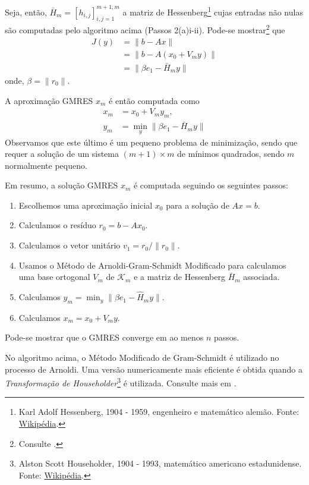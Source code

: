 Seja, então, $\bar{H}_m = [h_{i,j}]_{i,j=1}^{m+1,m}$ a matriz de Hessenberg\footnote{Karl Adolf Hessenberg, 1904 - 1959, engenheiro e matemático alemão. Fonte: \href{https://pt.wikipedia.org/wiki/Karl_Hessenberg}{Wikipédia}.} cujas entradas não nulas são computadas pelo algoritmo acima (Passos 2(a)i-ii). Pode-se mostrar\footnote{Consulte \cite[Proposição 6.5]{Saad2003}.} que
\begin{align}
  J(y) &= \|b-Ax\|\\
       &= \|b - A(x_0 + V_my)\|\\
       &= \|\beta e_1 - \bar{H}_my\|
\end{align}
onde, $\beta = \|r_0\|$.

A aproximação GMRES $x_m$ é então computada como
\begin{align}
  x_m &= x_0 + V_my_m,\\
  y_m &= \min_{y} \|\beta e_1 - \bar{H}_my\|
\end{align}
Observamos que este último é um pequeno problema de minimização, sendo que requer a solução de um sistema $(m+1)\times m$ de mínimos quadrados, sendo $m$ normalmente pequeno.


Em resumo, a solução GMRES $x_m$ é computada seguindo os seguintes passos:
\begin{enumerate}[1.]
\item Escolhemos uma aproximação inicial $x_0$ para a solução de $Ax = b$.
\item Calculamos o resíduo $r_0 = b - Ax_0$.
\item Calculamos o vetor unitário $v_1 = r_0/\|r_0\|$.
\item Usamos o Método de Arnoldi-Gram-Schmidt Modificado para calculamos uma base ortogonal $V_m$ de $\mathcal{K}_m$ e a matriz de Hessenberg $\bar{H}_m$ associada.
\item Calculamos $y_m = \min_{y} \|\beta e_1 - \hat{H}_my\|$.
\item Calculamos $x_m = x_0 + V_my$.
\end{enumerate}

\begin{obs}[Convergência]
  Pode-se mostrar que o GMRES converge em ao menos $n$ passos.
\end{obs}

\begin{obs}
  No algoritmo acima, o Método Modificado de Gram-Schmidt é utilizado no processo de Arnoldi. Uma versão numericamente mais eficiente é obtida quando a \emph{Transformação de Householder}\footnote{Alston Scott Householder, 1904 - 1993, matemático americano estadunidense. Fonte: \href{https://pt.wikipedia.org/wiki/Alston_Scott_Householder}{Wikipédia}.} é utilizada. Consulte mais em \cite[Subsetion 6.5.2]{Saad2003}.
\end{obs}

